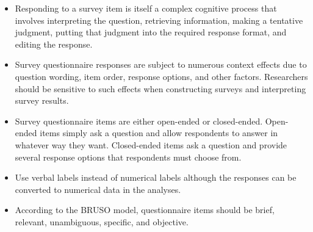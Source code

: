 \begin{fullwidth}

\begin{itemize}


\item Responding to a survey item is itself a complex cognitive process that involves interpreting the question, retrieving information, making a tentative judgment, putting that judgment into the required response format, and editing the response.

\item Survey questionnaire responses are subject to numerous context effects due to question wording, item order, response options, and other factors. Researchers should be sensitive to such effects when constructing surveys and interpreting survey results.

\item Survey questionnaire items are either open-ended or closed-ended. Open-ended items simply ask a question and allow respondents to answer in whatever way they want. Closed-ended items ask a question and provide several response options that respondents must choose from.

\item Use verbal labels instead of numerical labels although the responses can be converted to numerical data in the analyses.

\item According to the BRUSO model, questionnaire items should be brief, relevant, unambiguous, specific, and objective.


\end{itemize}

\end{fullwidth}



\subsection{}

